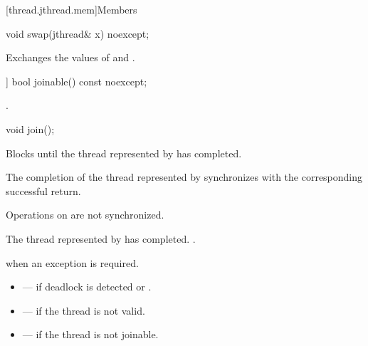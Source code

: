 [thread.jthread.mem]{Members}

%
\begin{itemdecl}
void swap(jthread& x) noexcept;
\end{itemdecl}

\begin{itemdescr}
\pnum
\effects
Exchanges the values of  and .
\end{itemdescr}

%
\begin{itemdecl}
[[nodiscard]] bool joinable() const noexcept;
\end{itemdecl}

\begin{itemdescr}
\pnum
\returns
{}.
\end{itemdescr}

%
\begin{itemdecl}
void join();
\end{itemdecl}

\begin{itemdescr}
\pnum
{}%
\effects
Blocks until the thread represented by  has completed.

\pnum
\sync
The completion of the thread represented by 
synchronizes with
the corresponding successful  return.
\begin{note}
Operations on  are not synchronized.
\end{note}

\pnum
\ensures
The thread represented by  has completed.
.

\pnum
\throws
{} when an exception is required.

\pnum
\errors
\begin{itemize}
\item {} --- if deadlock is detected or
.

\item {} --- if the thread is not valid.

\item {} --- if the thread is not joinable.
\end{itemize}
\end{itemdescr}

